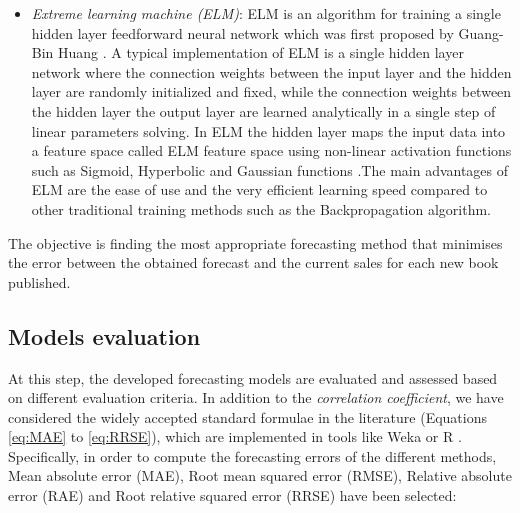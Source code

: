 \documentclass[a4paper,10pt,twocolumn,preprint,3p]{elsarticle}
\begin{document}
\begin{itemize}
\item \emph{Extreme learning machine (ELM)}: 
ELM is an algorithm for training a single hidden 
layer feedforward neural network which was first proposed by Guang-Bin Huang \cite
{huang2006extreme}. A typical implementation of ELM is a single hidden layer network where the 
connection weights between the input layer and the hidden layer are randomly initialized and 
fixed, while the connection weights between the hidden layer the output layer are learned 
analytically in a single step of linear parameters solving. In ELM the hidden layer maps the 
input data into a feature space called ELM feature space using non-linear activation functions 
such as Sigmoid, Hyperbolic and Gaussian functions \cite{huang2015trends}.The main advantages 
of ELM are the ease of use and the very efficient learning speed compared to other traditional 
training methods such as the Backpropagation algorithm. 

\end{itemize}

The objective is finding the most appropriate forecasting method that minimises 
the error between the obtained forecast and the current sales for each new book 
published.

\subsection{Models evaluation}
\label{subsec:models_evaluation}

At this step, the developed forecasting models are evaluated and assessed based on different evaluation criteria. In addition to the \textit{correlation coefficient}, we have considered the widely accepted standard formulae in the literature \cite{gepsoft} (Equations \ref{eq:MAE} to \ref{eq:RRSE}), which are implemented in tools like Weka \cite{pentaho,Witten2011} or R \cite{otexts,Hyndman2013}.
Specifically, in order to compute the forecasting errors of the different methods, Mean absolute error (MAE), Root mean squared error (RMSE), Relative absolute error (RAE) and Root relative squared error (RRSE) have been selected:
\end{document}
